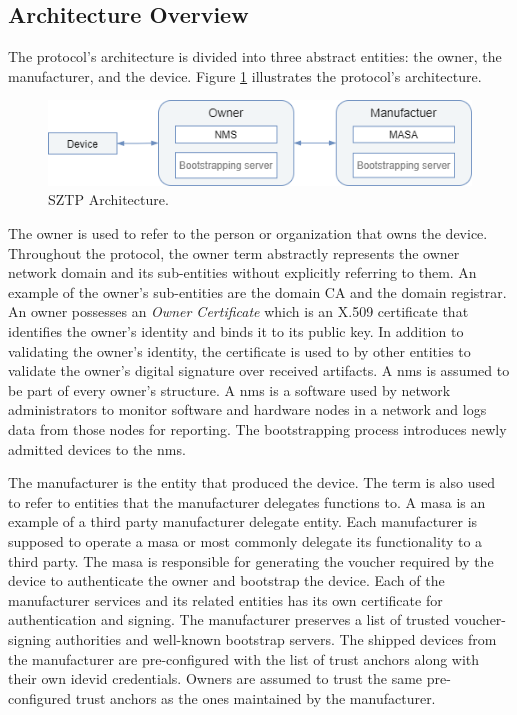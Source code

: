 \subsection{Architecture Overview}\label{subsec:sztp-overview}
The protocol's architecture is divided into three abstract entities: the owner, the manufacturer, and the device. Figure \ref{sztp-architecture} illustrates the protocol's architecture.
\begin{figure}[H]
	\centering
	\includegraphics[scale=0.4]{Images/sztp-overview.png}
	\caption{SZTP Architecture.}
	\label{sztp-architecture}
\end{figure}
The owner is used to refer to the person or organization that owns the device. Throughout the protocol, the owner term abstractly represents the owner network domain and its sub-entities without explicitly referring to them. An example of the owner's sub-entities are the domain CA and the domain registrar. An owner possesses an \textit{Owner Certificate} which is an X.509 certificate that identifies the owner's identity and binds it to its public key. In addition to validating the owner's identity, the certificate is used to by other entities to validate the owner's digital signature over received artifacts. A \gls{nms} is assumed to be part of every owner's structure. A \gls{nms} is a software used by network administrators to monitor software and hardware nodes in a network and logs data from those nodes for reporting. The bootstrapping process introduces newly admitted devices to the \gls{nms}. 
\par
The manufacturer is the entity that produced the device. The term is also used to refer to entities that the manufacturer delegates functions to. A \gls{masa} is an example of a third party manufacturer delegate entity. Each manufacturer is supposed to operate a \gls{masa} or most commonly delegate its functionality to a third party. The \gls{masa} is responsible for generating the voucher required by the device to authenticate the owner and bootstrap the device. Each of the manufacturer services and its related entities has its own certificate for authentication and signing. The manufacturer preserves a list of trusted voucher-signing authorities and well-known bootstrap servers. The shipped devices from the manufacturer are pre-configured with the list of trust anchors along with their own \gls{idevid} credentials. Owners are assumed to trust the same pre-configured trust anchors as the ones maintained by the manufacturer.
